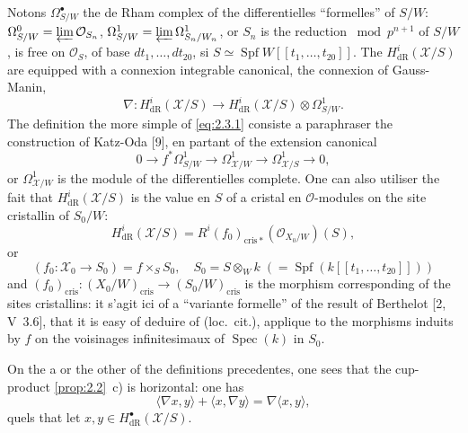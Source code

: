 \documentclass[12pt,a4paper]{article}
\theoremstyle{plain}
\theoremstyle{definition}
\theoremstyle{remark}
\DeclareMathOperator{\Spf}{Spf}
\DeclareMathOperator{\Spec}{Spec}
\newcommand{\cris}{\mathrm{cris}}
\begin{document}
Notons $\Omega_{S/W}^{\bullet}$ the de Rham complex of the differentielles ``formelles'' of $S/W$: $\Omega_{S/W}^{0} = \varprojlim \mathcal{O}_{S_n}$, $\Omega_{S/W}^{1} = \varprojlim \Omega^1_{S_n/W_n}$, or $S_n$ is the reduction $\bmod p^{n+1}$ of $S/W$, is free on $\mathcal{O}_S$, of base $dt_1, \ldots, dt_{20}$, si $S \simeq \Spf W[[t_1, \ldots, t_{20}]]$. The $H^i_{\mathrm{dR}}(\mathcal{X}/S)$ are equipped with a connexion integrable canonical, the connexion of Gauss-Manin,
\begin{equation}\label{eq:2.3.1}
\nabla: H^i_{\mathrm{dR}}(\mathcal{X}/S) \to H^i_{\mathrm{dR}}(\mathcal{X}/S) \otimes \Omega^1_{S/W}.
\end{equation}
The definition the more simple of \eqref{eq:2.3.1} consiste a paraphraser the construction of Katz-Oda [9], en partant of the extension canonical
\begin{equation}\label{eq:2.3.0}
0 \to f^*\Omega^1_{S/W} \to \Omega^1_{\mathcal{X}/W} \to \Omega^1_{\mathcal{X}/S} \to 0,
\end{equation}
or $\Omega^1_{\mathcal{X}/W}$ is the module of the differentielles complete. One can also utiliser the fait that $H^i_{\mathrm{dR}}(\mathcal{X}/S)$ is the value en $S$ of a cristal en $\mathcal{O}$-modules on the site cristallin of $S_0/W$:
\begin{equation}\label{eq:2.3.2}
H^i_{\mathrm{dR}}(\mathcal{X}/S) = R^i(f_0)_{\cris*}(\mathcal{O}_{X_0/W})(S),
\end{equation}
or
\begin{equation}\label{eq:2.3.2.1}
(f_0: \mathcal{X}_0 \to S_0) = f \times_S S_0, \quad S_0 = S \otimes_W k \; (= \Spf(k[[t_1, \ldots, t_{20}]]))
\end{equation}
and $(f_0)_{\cris}: (X_0/W)_{\cris} \to (S_0/W)_{\cris}$ is the morphism corresponding of the sites cristallins: it s'agit ici of a ``variante formelle'' of the result of Berthelot [2, V~3.6], that it is easy of deduire of (loc.~cit.), applique to the morphisms induits by $f$ on the voisinages infinitesimaux of $\Spec(k)$ in $S_0$.

On the a or the other of the definitions precedentes, one sees that the cup-product \ref{prop:2.2}~c) is horizontal: one has
\begin{equation}\label{eq:2.3.3}
\langle \nabla x, y \rangle + \langle x, \nabla y \rangle = \nabla \langle x, y \rangle,
\end{equation}
quels that let $x, y \in H^{\bullet}_{\mathrm{dR}}(\mathcal{X}/S)$.
\end{document}
